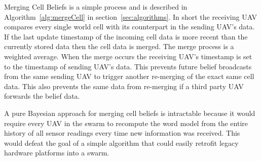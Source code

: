 
	

Merging Cell Beliefs is a simple process and is described in Algorithm~\ref{alg:mergeCell} in section~\ref{sec:algorithms}.   In short the receiving UAV compares every single world cell with its counterpart in the sending UAV's data.  If the last update timestamp of the incoming cell data is more recent than the currently stored data then the cell data is merged.  The merge process is a weighted average.  When the merge occurs the receiving UAV's timestamp is set to the timestamp of sending UAV's data.  This prevents future belief broadcasts from the same sending UAV to trigger another re-merging of the exact same cell data.  This also prevents the same data from re-merging if a third party UAV forwards the belief data. 


A pure Bayesian approach for merging cell beliefs is intractable because it would require every UAV in the swarm to recompute the word model from the entire history of all sensor readings every time new information was received.  This would defeat the goal of a simple algorithm that could easily retrofit legacy hardware platforms into a swarm.




